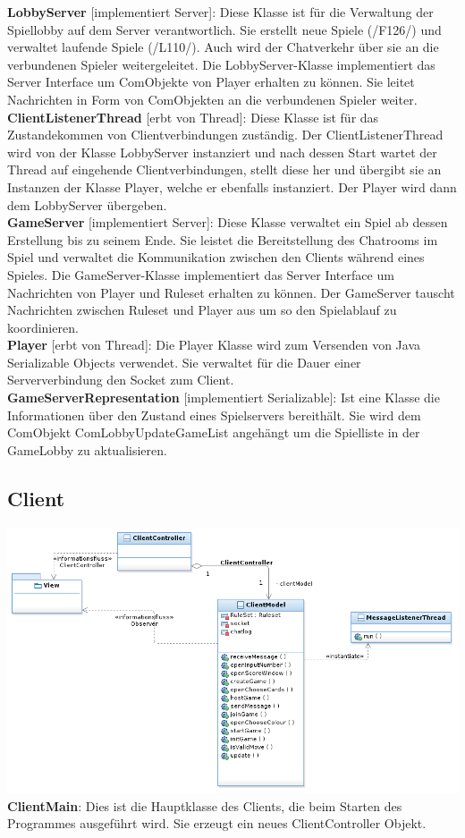 \documentclass{article}
\begin{document}
\textbf{LobbyServer} [implementiert Server]: Diese Klasse ist für die Verwaltung der Spiellobby auf dem Server verantwortlich. Sie erstellt neue Spiele (/F126/) und verwaltet laufende Spiele (/L110/). Auch wird der Chatverkehr über sie an die verbundenen Spieler weitergeleitet. Die LobbyServer-Klasse implementiert das Server Interface um ComObjekte von Player erhalten zu können. Sie leitet Nachrichten in Form von ComObjekten an die verbundenen Spieler weiter. \\

\textbf{ClientListenerThread} [erbt von Thread]: Diese Klasse ist für das Zustandekommen von Clientverbindungen zuständig. Der ClientListenerThread wird von der Klasse LobbyServer instanziert und nach dessen Start wartet der Thread auf eingehende Clientverbindungen, stellt diese her und übergibt sie an Instanzen der Klasse Player, welche er ebenfalls instanziert. Der Player wird dann dem LobbyServer übergeben. \\

\textbf{GameServer} [implementiert Server]: Diese Klasse verwaltet ein Spiel ab dessen Erstellung bis zu seinem Ende. Sie leistet die Bereitstellung des Chatrooms im Spiel und verwaltet die Kommunikation zwischen den Clients während eines Spieles. Die GameServer-Klasse implementiert das Server Interface um Nachrichten von Player und Ruleset erhalten zu können. Der GameServer tauscht Nachrichten zwischen Ruleset und Player aus um so den Spielablauf zu koordinieren.\\

\textbf{Player} [erbt von Thread]: Die Player Klasse wird zum Versenden von Java Serializable Objects verwendet. Sie verwaltet für die Dauer einer Serververbindung den Socket zum Client. \\

\textbf{GameServerRepresentation} [implementiert Serializable]: Ist eine Klasse die Informationen über den Zustand eines Spielservers bereithält. Sie wird dem ComObjekt ComLobbyUpdateGameList angehängt um die Spielliste in der GameLobby zu aktualisieren.

\subsection{Client}
\includegraphics[width=\textwidth]{Client}
\textbf{ClientMain}: Dies ist die Hauptklasse des Clients, die beim Starten des Programmes ausgeführt wird. Sie erzeugt ein neues ClientController Objekt.\\
\end{document}
